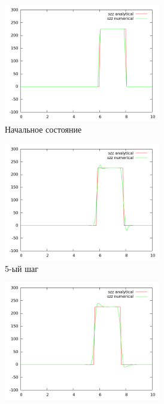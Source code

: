 \begin{figure}[H]
\begin{subfigure}[b]{0.5\textwidth}
\centering
\includegraphics[width=0.75\textwidth]{png/veryfication/0.2/p-wave-along-z0.png}
\caption{Начальное состояние}
\end{subfigure}
\begin{subfigure}[b]{0.5\textwidth}
\centering
\includegraphics[width=0.75\textwidth]{png/veryfication/0.2/p-wave-along-z5.png}
\caption{5-ый шаг}
\end{subfigure}
\begin{subfigure}[b]{0.5\textwidth}
\centering
\includegraphics[width=0.75\textwidth]{png/veryfication/0.2/p-wave-along-z10.png}

\end{subfigure}
\end{figure}
